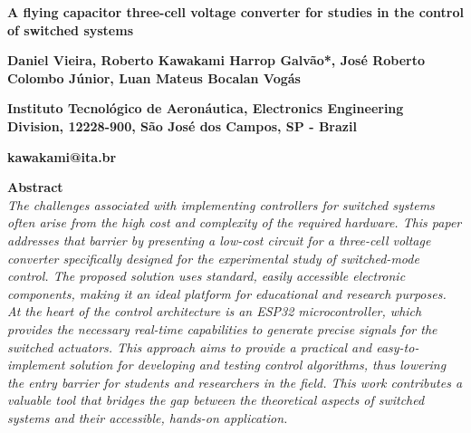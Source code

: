 \documentclass[11pt, letterpaper]{article}
\begin{document}
\begin{flushleft}

  {\Huge \bf A flying capacitor three-cell voltage converter for studies in the control of switched systems}

  \setlength{\parindent}{0pt}
  \setlength{\parskip}{10pt}


  \textbf{Daniel Vieira, Roberto Kawakami Harrop Galvão*, José Roberto Colombo Júnior, Luan Mateus Bocalan Vogás}


  \textbf{Instituto Tecnológico de Aeronáutica, Electronics Engineering Division, 12228-900, São José dos Campos, SP - Brazil}


  \textbf{kawakami@ita.br}




  \textbf{Abstract}\\ \textit{
    The challenges associated with implementing controllers for switched systems often arise from the high cost and complexity of the required hardware.
    This paper addresses that barrier by presenting a low-cost circuit for a three-cell voltage converter specifically designed for the experimental
    study of switched-mode control. The proposed solution uses standard, easily accessible electronic components, making it an ideal platform for
    educational and research purposes. At the heart of the control architecture is an ESP32 microcontroller, which provides the necessary real-time
    capabilities to generate precise signals for the switched actuators. This approach aims to provide a practical and easy-to-implement solution for
    developing and testing control algorithms, thus lowering the entry barrier for students and researchers in the field.
    This work contributes a valuable tool that bridges the gap between the theoretical aspects of switched systems and their accessible,
    hands-on application.}


\end{flushleft}
\end{document}
